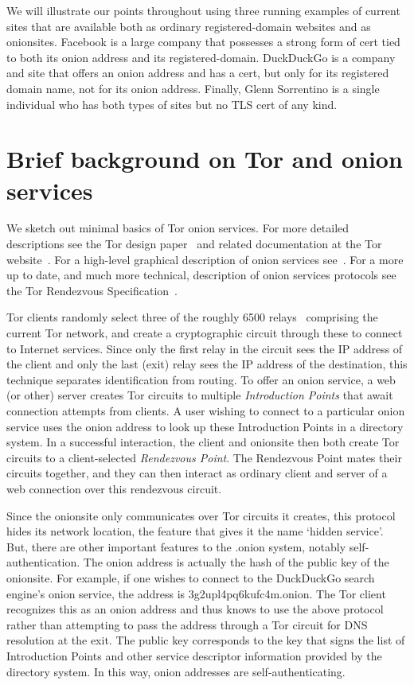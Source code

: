 \documentclass[10pt, conference, compsocconf]{styles/IEEEtran}
\begin{document}
We will illustrate our points throughout using three running examples
of current sites that are available both as ordinary registered-domain
websites and as onionsites. Facebook is a large company that
possesses a strong form of cert tied to both its onion address and its
registered-domain. DuckDuckGo is a company and site that offers an
onion address and has a cert, but only for its registered domain name,
not for its onion address.  Finally, Glenn Sorrentino is a single
individual who has both types of sites but no TLS cert of any kind.

\section{Brief background on Tor and onion services}

We sketch out minimal basics of Tor onion services. For more detailed
descriptions see the Tor design paper~\cite{tor-design} and related documentation at the
Tor website~\cite{torproject}. For a high-level graphical description
of onion services see~\cite{tor-hs}. For a more up to date, and much
more technical, description of onion services protocols see the Tor
Rendezvous Specification~\cite{tor-rend-spec}.

Tor clients randomly select three of the roughly 6500 relays~\cite{tor-network-size}
comprising the current Tor network, and create a cryptographic circuit
through these to connect to Internet services. Since only the first
relay in the circuit sees the IP address of the client and
only the last (exit) relay sees the IP address of the destination,
this technique separates identification from routing.
To offer an onion service, a web (or other) server creates Tor circuits to
multiple \emph{Introduction Points} that await connection attempts
from clients. A user wishing to connect to a particular onion service
uses the onion address to look up these Introduction Points in a
directory system. In a successful interaction, the client and
onionsite then both create Tor circuits to a client-selected
\emph{Rendezvous Point}. The Rendezvous Point mates their circuits
together, and they can then interact as ordinary client and server of
a web connection over this rendezvous circuit.

Since the onionsite only communicates over Tor circuits it creates,
this protocol hides its network location, the feature that
gives it the name `hidden service'. But, there are other important
features to the .onion system, notably self-authentication. The onion
address is actually the hash of the public key of the onionsite. For
example, if one wishes to connect to the DuckDuckGo search engine's
onion service, the address is 3g2upl4pq6kufc4m.onion. The Tor client
recognizes this as an onion address and thus knows to use the above
protocol rather than attempting to pass the address through a Tor
circuit for DNS resolution at the exit. The public key
corresponds to the key that signs the list of Introduction Points
and other service descriptor information provided by the directory
system. In this way, onion addresses are self-authenticating.
\end{document}
